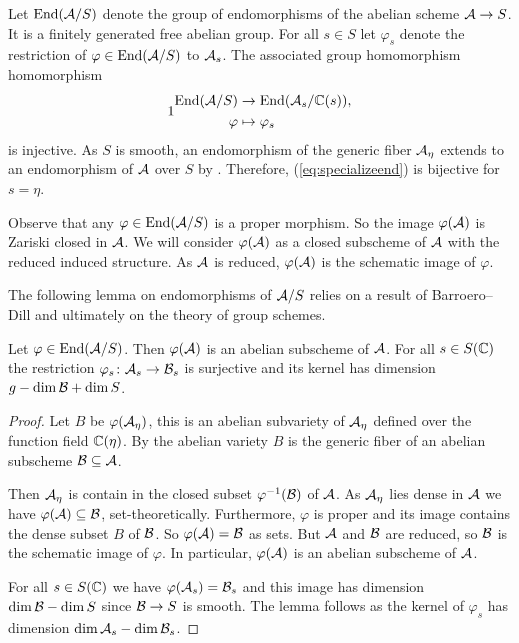 \documentclass[12pt,oneside]{amsart}
\begin{document}
Let $\mathrm{End}(\mathcal{A}/S)$ denote the group of endomorphisms of the
abelian scheme $\mathcal{A}\rightarrow S$. It is a finitely generated free
abelian group. For all $s\in S$ let $\varphi_s$ denote the restriction
of $\varphi \in \mathrm{End}(\mathcal{A}/S)$ to $\mathcal{A}_s$. The associated group homomorphism
homomorphism
\begin{alignat}1
  \label{eq:specializeend}
  \begin{aligned}
    \mathrm{End}(\cA/S) &\rightarrow \mathrm{End}(\cA_s/\IC(s)),\\
    \varphi&\mapsto \varphi_s
  \end{aligned}  
\end{alignat}
is injective.
As $S$ is smooth, an endomorphism of the generic fiber $\mathcal{A}_\eta$
extends to an endomorphism of $\mathcal{A}$ over $S$
by \cite[Proposition I.2.7]{FaltingsChai}. Therefore, (\ref{eq:specializeend}) is
bijective for $s=\eta$. 


Observe that any $\varphi\in \mathrm{End}(\mathcal{A}/S)$ is a
proper morphism. So the image $\varphi(\mathcal{A})$ is Zariski closed in
$\mathcal{A}$. We will consider $\varphi(\mathcal{A})$ as a closed subscheme of
$\mathcal{A}$ with the reduced induced structure. As $\mathcal{A}$ is reduced,  $\varphi(\mathcal{A})$ is the schematic
image of $\varphi$.

The following lemma on endomorphisms of $\mathcal{A}/S$ relies on a result of
Barroero--Dill and ultimately on the theory of group schemes.

\begin{lemma}
  \label{lem:endabscheme}
  Let $\varphi\in\mathrm{End}(\mathcal{A}/S)$. Then $\varphi(\mathcal{A})$ is an
  abelian subscheme of $\mathcal{A}$. For all $s\in S({\mathbb{C}})$ the restriction
  $\varphi_s \colon \mathcal{A}_s\rightarrow \mathcal{B}_s$
  is surjective and its kernel has dimension $g-\dim \mathcal{B} + \dim S$. 
\end{lemma}
\begin{proof}
  Let $B$ be $\varphi(\mathcal{A}_\eta)$, this is an abelian subvariety of
  $\mathcal{A}_\eta$ defined over the function field ${\mathbb{C}}(\eta)$.
  By \cite[Lemma 2.9]{BarDill} the abelian variety $B$ is the generic fiber of an
  abelian subscheme $\mathcal{B}\subseteq \mathcal{A}$.

  Then $\mathcal{A}_\eta$ is contain in the closed subset $\varphi^{-1}(\mathcal{B})$
  of $\mathcal{A}$. As $\mathcal{A}_\eta$ lies dense in $\mathcal{A}$ we have
  $\varphi(\mathcal{A})\subseteq \mathcal{B}$, set-theoretically.
  Furthermore, $\varphi$ is proper and its image contains the dense subset $B$ of $\mathcal{B}$. So 
   $\varphi(\mathcal{A})=\mathcal{B}$ as sets. But $\mathcal{A}$ and $\mathcal{B}$ are reduced, so
  $\mathcal{B}$ is the schematic image of $\varphi$. In particular,
  $\varphi(\mathcal{A})$ is an abelian subscheme of $\mathcal{A}$. 

  For all $s\in S({\mathbb{C}})$ we have $\varphi(\mathcal{A}_s) = \mathcal{B}_s$ and this image has
  dimension $\dim \mathcal{B}-\dim S$ since $\mathcal{B}\rightarrow S$ is smooth. The
  lemma follows as the
  kernel of $\varphi_s$ has dimension $\dim \mathcal{A}_s-\dim \mathcal{B}_s$.
\end{proof}
\end{document}
